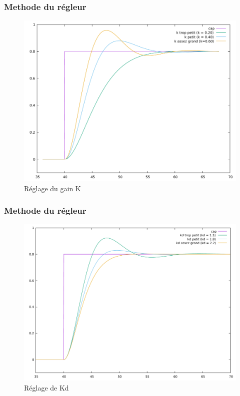 \documentclass{beamer}
\begin{document}
\begin{frame}\frametitle{Methode du régleur}
\begin{figure}
\includegraphics[scale=0.28]{courbesk.pdf} 
\caption{Réglage du gain K}
\end{figure}
\end{frame}

\begin{frame}\frametitle{Methode du régleur}
\begin{figure}
\includegraphics[scale=0.28]{courbeskd.pdf} 
\caption{Réglage de Kd}
\end{figure}
\end{frame}
\end{document}
